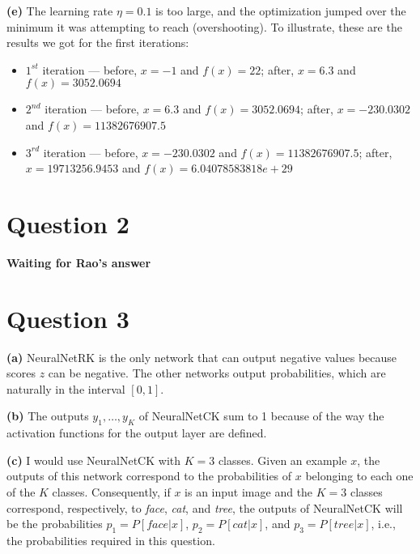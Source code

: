 \documentclass[leqno]{article}
\begin{document}
\hfill

\noindent \textbf{(e)} The learning rate $\eta = 0.1$ is too large, and the optimization jumped over the minimum it was attempting to reach (overshooting). To
illustrate, these are the results we got for the first iterations:
\begin{itemize}
\item $1^{st}$ iteration --- before, $x = -1$ and $f(x) = 22$; after, $x = 6.3$ and $f(x) = 3052.0694$
\item $2^{nd}$ iteration --- before, $x = 6.3$ and $f(x) = 3052.0694$; after, $x = -230.0302$ and $f(x) = 11382676907.5$
\item $3^{rd}$ iteration --- before, $x = -230.0302$ and $f(x) = 11382676907.5$; after, $x = 19713256.9453$ and $f(x) = 6.04078583818e+29$
\end{itemize}  

\hfill

\section*{Question 2} \textbf{Waiting for Rao's answer}

\hfill

\section*{Question 3} \textbf{(a)} NeuralNetRK is the only network that can output negative values because scores $z$ can be negative. The other 
networks output probabilities, which are naturally in the interval $[0,1]$.

\hfill

\noindent \textbf{(b)} The outputs $y_1, \ldots, y_K$ of NeuralNetCK sum to 1 because of the way the activation functions for the output layer are defined. 

\hfill

\noindent \textbf{(c)} I would use NeuralNetCK with $K = 3$ classes. Given an example $x$, the outputs of this network correspond to the probabilities of $x$ belonging to 
 each one of the $K$ classes. Consequently, if $x$ is an input image and the $K = 3$ classes correspond, respectively, to \textit{face}, \textit{cat}, and \textit{tree}, the 
outputs of NeuralNetCK will be the probabilities $p_1 = P[face|x]$, $p_2 = P[cat|x]$, and $p_3 = P[tree|x]$, i.e., the probabilities required in this question. 

\hfill
\end{document}
